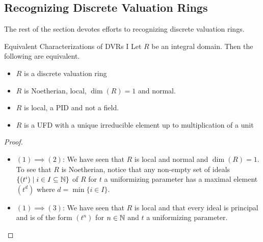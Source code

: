 \documentclass[a4paper]{article}
\begin{document}
\subsection{Recognizing Discrete Valuation Rings}
The rest of the section devotes efforts to recognizing discrete valuation rings. 

\begin{prp}{Equivalent Characterizations of DVRs I}{} Let $R$ be an integral domain. Then the following are equivalent. 
\begin{itemize}
\item $R$ is a discrete valuation ring
\item $R$ is Noetherian, local, $\dim(R)=1$ and normal. 
\item $R$ is local, a PID and not a field. 
\item $R$ is a UFD with a unique irreducible element up to multiplication of a unit
\end{itemize} \tcbline
\begin{proof}~\\
\begin{itemize}
\item $(1)\implies(2)$: We have seen that $R$ is local and normal and $\dim(R)=1$. To see that $R$ is Noetherian, notice that any non-empty set of ideals $\{(t^i)\;|\;i\in I\subseteq\mathbb{N}\}$ of $R$ for $t$ a uniformizing parameter has a maximal element $(t^d)$ where $d=\min\{i\in I\}$. 
\item $(1)\implies(3)$: We have seen that $R$ is local and that every ideal is principal and is of the form $(t^n)$ for $n\in\mathbb{N}$ and $t$ a uniformizing parameter. 

\end{itemize}
\end{proof}
\end{prp}
\end{document}
